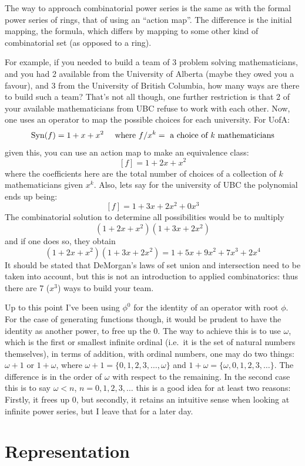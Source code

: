 \documentclass[twoside]{article}
\begin{document}
The way to approach combinatorial power series is the same as with the formal power series of rings, that of using
an ``action map''.  The difference is the initial mapping, the formula, which differs by mapping to some other kind
of combinatorial set (as opposed to a ring).

For example, if you needed to build a team of 3 problem solving mathematicians, and you had 2 available from the
University of Alberta (maybe they owed you a favour), and 3 from the University of British Columbia, how many ways
are there to build such a team?  That's not all though, one further restriction is that 2 of your available
mathematicians from UBC refuse to work with each other.  Now, one uses an operator to map the possible choices for
each university.  For UofA:
$$ \mbox{Syn}(f)=1+x+x^2\quad\mbox{ where } f/x^k=\mbox{ a choice of $ k $ mathematicians} $$
given this, you can use an action map to make an equivalence class:
$$ [f]=1+2x+x^2 $$
where the coefficients here are the total number of choices of a collection of $ k $ mathematicians given $ x^k $.
Also, lets say for the university of UBC the polynomial ends up being:
$$ [f]=1+3x+2x^2+0x^3 $$
The combinatorial solution to determine all possibilities would be to multiply
$$ (1+2x+x^2)(1+3x+2x^2) $$
and if one does so, they obtain
$$ (1+2x+x^2)(1+3x+2x^2)=1+5x+9x^2+7x^3+2x^4 $$
It should be stated that DeMorgan's laws of set union and intersection need to be taken into account, but this is
not an introduction to applied combinatorics:  thus there are 7 ($ x^3 $) ways to build your team.

Up to this point I've been using $ \phi^0 $ for the identity of an operator with root $ \phi $.  For the case of
generating functions though, it would be prudent to have the identity as another power, to free up the $ 0 $.
The way to achieve this is to use $ \omega $, which is the first or smallest infinite ordinal (i.e.~it is the set of
natural numbers themselves), in terms of addition, with ordinal numbers, one may do two things: $ \omega+1 $ or
$ 1+\omega $, where $ \omega+1=\{0, 1, 2, 3,\ldots, \omega\} $ and $ 1+\omega=\{\omega, 0, 1, 2, 3,\ldots\} $.
The difference is in the order of $ \omega $ with respect to the remaining.  In the second case this is to say
$ \omega < n $, $ n=0, 1, 2, 3,\ldots $  this is a good idea for at least two reasons:  Firstly, it frees up $ 0 $,
but secondly, it retains an intuitive sense when looking at infinite power series, but I leave that for a later day.

\section{Representation}
\end{document}
